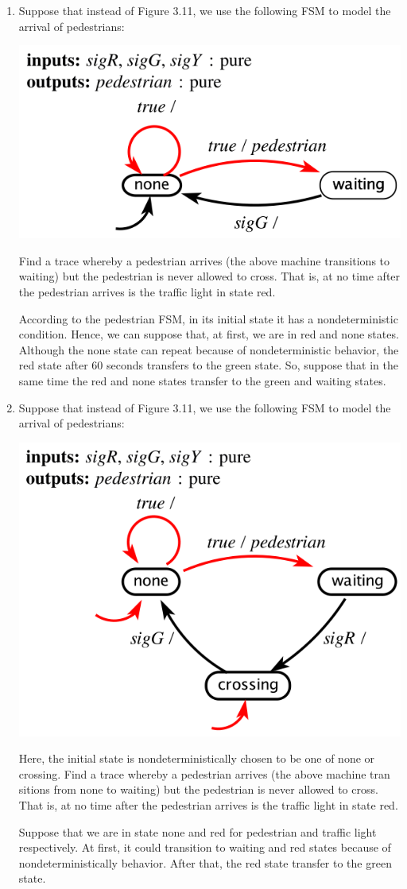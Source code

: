 \documentclass[12pt]{article}
\begin{document}
\begin{enumerate}
	\item Suppose that instead of Figure 3.11, we use the following FSM to model the
	arrival of pedestrians:
	
	\centering\includegraphics*[width=0.5\linewidth]{images/img4}
	
	\raggedright Find a trace whereby a pedestrian arrives (the above machine transitions to
	waiting) but the pedestrian is never allowed to cross. That is, at no time after
	the pedestrian arrives is the traffic light in state red.
	\begin{qsolve}[Solution]
		According to the pedestrian FSM, in its initial state it has a nondeterministic condition. Hence,
		we can suppose that, at first, we are in red and none states. Although the none state can
		repeat because of nondeterministic behavior, the red state after 60 seconds transfers to the
		green state. So, suppose that in the same time the red and none states transfer to the green
		and waiting states.
	\end{qsolve}
	
	\item Suppose that instead of Figure 3.11, we use the following FSM to model the arrival of pedestrians:
	
	\centering\includegraphics*[width=0.5\linewidth]{images/img5}
	
	\raggedright Here, the initial state is nondeterministically chosen to be one of none or
	crossing. Find a trace whereby a pedestrian arrives (the above machine tran
	sitions from none to waiting) but the pedestrian is never allowed to cross. That
	is, at no time after the pedestrian arrives is the traffic light in state red.
	\begin{qsolve}[Solution]
		Suppose that we are in state none and red for pedestrian and traffic light respectively. At first,
		it could transition to waiting and red states because of nondeterministically behavior. After
		that, the red state transfer to the green state.	
	\end{qsolve}
\end{enumerate}
\end{document}
